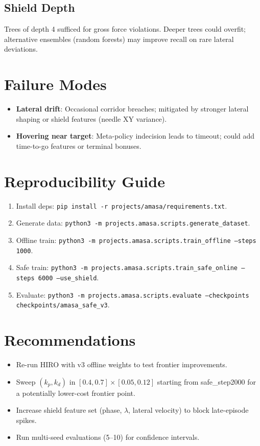 \documentclass[conference]{IEEEtran}
\begin{document}
\subsection{Shield Depth}
Trees of depth 4 sufficed for gross force violations. Deeper trees could overfit; alternative ensembles (random forests) may improve recall on rare lateral deviations.

\section{Failure Modes}
\begin{itemize}[leftmargin=*]
    \item \textbf{Lateral drift}: Occasional corridor breaches; mitigated by stronger lateral shaping or shield features (needle XY variance).
    \item \textbf{Hovering near target}: Meta-policy indecision leads to timeout; could add time-to-go features or terminal bonuses.
\end{itemize}

\section{Reproducibility Guide}
\begin{enumerate}[leftmargin=*]
    \item Install deps: \texttt{pip install -r projects/amasa/requirements.txt}.
    \item Generate data: \texttt{python3 -m projects.amasa.scripts.generate\_dataset}.
    \item Offline train: \texttt{python3 -m projects.amasa.scripts.train\_offline --steps 1000}.
    \item Safe train: \texttt{python3 -m projects.amasa.scripts.train\_safe\_online --steps 6000 --use\_shield}.
    \item Evaluate: \texttt{python3 -m projects.amasa.scripts.evaluate --checkpoints checkpoints/amasa\_safe\_v3}.
\end{enumerate}

\section{Recommendations}
\begin{itemize}[leftmargin=*]
    \item Re-run HIRO with v3 offline weights to test frontier improvements.
    \item Sweep $(k_p,k_d)$ in $[0.4,0.7]\times[0.05,0.12]$ starting from safe\_step2000 for a potentially lower-cost frontier point.
    \item Increase shield feature set (phase, $\lambda$, lateral velocity) to block late-episode spikes.
    \item Run multi-seed evaluations (5--10) for confidence intervals.
\end{itemize}
\end{document}
